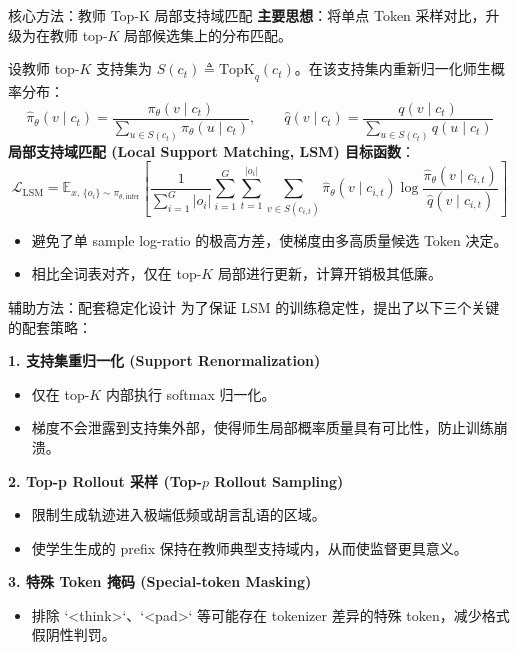 \documentclass{beamer}
\begin{document}
\begin{frame}[t]{核心方法：教师 Top-K 局部支持域匹配}
  \small
  \textbf{主要思想}：将单点 Token 采样对比，升级为在教师 top-$K$ 局部候选集上的分布匹配。
  
  \vspace{0.1cm}
  设教师 top-$K$ 支持集为 $S(c_t) \triangleq \mathrm{TopK}_q(c_t)$。在该支持集内重新归一化师生概率分布：
  \[
    \hat{\pi}_\theta(v \mid c_t) = \frac{\pi_\theta(v \mid c_t)}{\sum_{u \in S(c_t)}\pi_\theta(u \mid c_t)}, \qquad \hat{q}(v \mid c_t) = \frac{q(v \mid c_t)}{\sum_{u \in S(c_t)}q(u \mid c_t)}
  \]
  \textbf{局部支持域匹配 (Local Support Matching, LSM) 目标函数}：
  \[
    \mathcal{L}_{\mathrm{LSM}} = \mathbb{E}_{x,\, \{o_i\} \sim \pi_{\theta,\mathrm{infer}}} \left[ \frac{1}{\sum_{i=1}^{G} |o_i|} \sum_{i=1}^{G} \sum_{t=1}^{|o_i|} \sum_{v \in S(c_{i,t})} \hat \pi_\theta(v \mid c_{i,t}) \log \frac{\hat \pi_\theta(v \mid c_{i,t})}{\hat q(v \mid c_{i,t})} \right]
  \]
  \begin{itemize}
    \item 避免了单 sample log-ratio 的极高方差，使梯度由多高质量候选 Token 决定。
    \item 相比全词表对齐，仅在 top-$K$ 局部进行更新，计算开销极其低廉。
  \end{itemize}
\end{frame}

\begin{frame}[t]{辅助方法：配套稳定化设计}
  \small
  为了保证 LSM 的训练稳定性，提出了以下三个关键的配套策略：
  
  \vspace{0.2cm}
  \textbf{1. 支持集重归一化 (Support Renormalization)}
  \begin{itemize}
    \item 仅在 top-$K$ 内部执行 softmax 归一化。
    \item 梯度不会泄露到支持集外部，使得师生局部概率质量具有可比性，防止训练崩溃。
  \end{itemize}
  
  \vspace{0.15cm}
  \textbf{2. Top-p Rollout 采样 (Top-$p$ Rollout Sampling)}
  \begin{itemize}
    \item 限制生成轨迹进入极端低频或胡言乱语的区域。
    \item 使学生生成的 prefix 保持在教师典型支持域内，从而使监督更具意义。
  \end{itemize}
  
  \vspace{0.15cm}
  \textbf{3. 特殊 Token 掩码 (Special-token Masking)}
  \begin{itemize}
    \item 排除 `<think>`、`<pad>` 等可能存在 tokenizer 差异的特殊 token，减少格式假阴性判罚。
  \end{itemize}
\end{frame}
\end{document}
